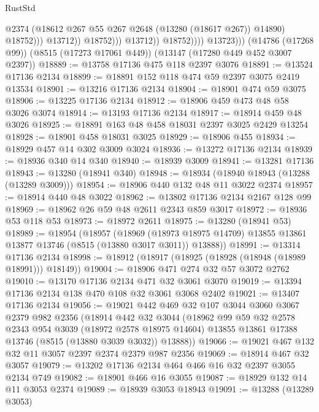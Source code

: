 \begin{lexlean}{RustStd}
\begin{coremodule}
                                      @2374
                                      (@18612 @267 @55 @267 @2648 (@13280 (@18617 @267)) @14890)
                                      @18752)))
                                @13712))
                            @18752)))
                      @13712))
                  @18752))))
          @13723)))
    (@14786 (@17268 @99))
    (@8515 (@17273 @17061 @449))
    (@13147 (@17280 @449 @452 @3007 @2397))
@18889 := @13758 @17136 @475 @118 @2397 @3076
@18891 := @13524 @17136 @2134
@18899 := @18891 @152 @118 @474 @59 @2397 @3075 @2419 @13534
@18901 := @13216 @17136 @2134
@18904 := @18901 @474 @59 @3075
@18906 := @13225 @17136 @2134
@18912 := @18906 @459 @473 @48 @58 @3026 @3074
@18914 := @13193 @17136 @2134
@18917 := @18914 @459 @48 @3026
@18925 := @18891 @163 @48 @458 @18031 @2397 @3025 @2429 @13254
@18928 := @18901 @458 @18031 @3025
@18929 := @18906 @455
@18934 := @18929 @457 @14 @302 @3009 @3024
@18936 := @13272 @17136 @2134
@18939 := @18936 @340 @14 @340
@18940 := @18939 @3009
@18941 := @13281 @17136
@18943 := @13280 (@18941 @340)
@18948 := @18934 (@18940 @18943 (@13288 (@13289 @3009)))
@18954 := @18906 @440 @132 @48 @11 @3022 @2374
@18957 := @18914 @440 @48 @3022
@18962 := @13802 @17136 @2134 @2167 @128 @99
@18969 := @18962 @26 @59 @48 @2611 @2343 @859 @3017
@18972 := @18936 @53 @118 @53
@18973 := @18972 @2611
@18975 := @13280 (@18941 @53)
@18989 := @18954
    (@18957
      (@18969
        (@18973 @18975 @14709)
        @13855
        @13861
        @13877
        @13746
        (@8515 (@13880 @3017 @3011))
        @13888))
@18991 := @13314 @17136 @2134
@18998 := @18912 (@18917 (@18925 (@18928 (@18948 (@18989 @18991))) @18149))
@19004 := @18906 @471 @274 @32 @57 @3072 @2762
@19010 := @13170 @17136 @2134 @471 @32 @3061 @3070
@19019 := @13394 @17136 @2134 @138 @470 @108 @32 @3061 @3068 @2402
@19021 := @13407 @17136 @2134
@19056 := @19021
    @442
    @469
    @32
    @107
    @3044
    @3060
    @3067
    @2379
    @982
    @2356
    (@18914
      @442
      @32
      @3044
      (@18962
        @99
        @59
        @32
        @2578
        @2343
        @954
        @3039
        (@18972 @2578 @18975 @14604)
        @13855
        @13861
        @17388
        @13746
        (@8515 (@13880 @3039 @3032))
        @13888))
@19066 := @19021 @467 @132 @32 @11 @3057 @2397 @2374 @2379 @987 @2356
@19069 := @18914 @467 @32 @3057
@19079 := @13202 @17136 @2134 @464 @466 @16 @32 @2397 @3055 @2134 @749
@19082 := @18901 @466 @16 @3055
@19087 := @18929 @132 @14 @11 @3053 @2374
@19089 := @18939 @3053 @18943
@19091 := @13288 (@13289 @3053)

\end{coremodule}
\end{lexlean}
